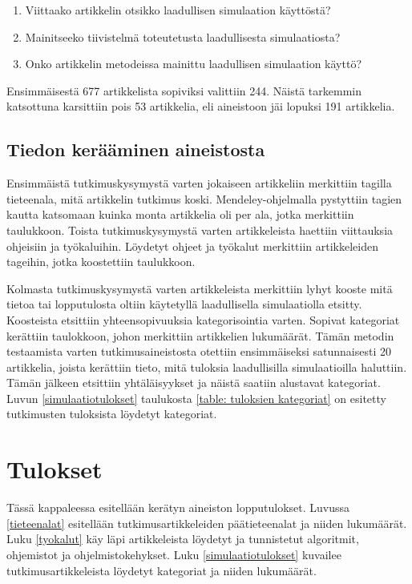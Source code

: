 \documentclass[utf8]{gradu3}
\begin{document}
\begin{enumerate}
    \item Viittaako artikkelin otsikko laadullisen simulaation käyttöstä?
    \item Mainitseeko tiivistelmä toteutetusta laadullisesta simulaatiosta?
    \item Onko artikkelin metodeissa mainittu laadullisen simulaation käyttö?
\end{enumerate}

Ensimmäisestä 677 artikkelista sopiviksi valittiin 244. Näistä tarkemmin katsottuna karsittiin pois 53 artikkelia, eli aineistoon jäi lopuksi 191 artikkelia.

\section{Tiedon kerääminen aineistosta} \label{aineiston analysointi}
Ensimmäistä tutkimuskysymystä varten jokaiseen artikkeliin merkittiin tagilla tieteenala, mitä artikkelin tutkimus koski. Mendeley-ohjelmalla pystyttiin tagien kautta katsomaan kuinka monta artikkelia oli per ala, jotka merkittiin taulukkoon. Toista tutkimuskysymystä varten artikkeleista haettiin viittauksia ohjeisiin ja työkaluihin. Löydetyt ohjeet ja työkalut merkittiin artikkeleiden tageihin, jotka koostettiin taulukkoon.

Kolmasta tutkimuskysymystä varten artikkeleista merkittiin lyhyt kooste mitä tietoa tai lopputulosta oltiin käytetyllä laadullisella simulaatiolla etsitty. Koosteista etsittiin yhteensopivuuksia kategorisointia varten. Sopivat kategoriat kerättiin taulokkoon, johon merkittiin artikkelien lukumäärät. Tämän metodin testaamista varten tutkimusaineistosta otettiin ensimmäiseksi satunnaisesti 20 artikkelia, joista kerättiin tieto, mitä tuloksia laadullisilla simulaatioilla haluttiin. Tämän jälkeen etsittiin yhtäläisyykset ja näistä saatiin alustavat kategoriat. Luvun \ref{simulaatiotulokset} taulukosta \ref{table: tuloksien kategoriat} on esitetty tutkimusten tuloksista löydetyt kategoriat.

\chapter{Tulokset}
Tässä kappaleessa esitellään kerätyn aineiston lopputulokset. Luvussa \ref{tieteenalat} esitellään tutkimusartikkeleiden päätieteenalat ja niiden lukumäärät. Luku \ref{tyokalut} käy läpi artikkeleista löydetyt ja tunnistetut algoritmit, ohjemistot ja ohjelmistokehykset. Luku \ref{simulaatiotulokset} kuvailee tutkimusartikkeleista löydetyt kategoriat ja niiden lukumäärät.
\end{document}
